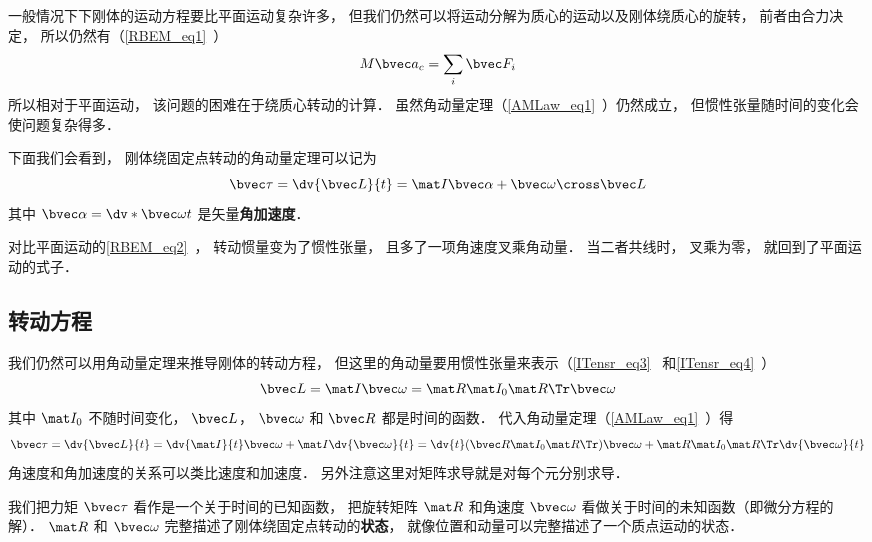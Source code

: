 

一般情况下下刚体的运动方程要比平面运动复杂许多， 但我们仍然可以将运动分解为质心的运动以及刚体绕质心的旋转， 前者由合力决定， 所以仍然有（\autoref{RBEM_eq1}~）
\begin{equation}\label{RBEqM_eq8}
M\bvec a_c = \sum_i \bvec F_i
\end{equation}
所以相对于平面运动， 该问题的困难在于绕质心转动的计算． 虽然角动量定理（\autoref{AMLaw_eq1}~）仍然成立， 但惯性张量随时间的变化会使问题复杂得多．

下面我们会看到， 刚体绕固定点转动的角动量定理可以记为
\begin{equation}
\bvec\tau = \dv{\bvec L}{t} = \mat I \bvec\alpha + \bvec\omega \cross \bvec L
\end{equation}
其中 $\bvec\alpha = \dv*{\bvec\omega}{t}$ 是矢量\textbf{角加速度}．

对比平面运动的\autoref{RBEM_eq2}~， 转动惯量变为了惯性张量， 且多了一项角速度叉乘角动量． 当二者共线时， 叉乘为零， 就回到了平面运动的式子．

\subsection{转动方程}
我们仍然可以用角动量定理来推导刚体的转动方程， 但这里的角动量要用惯性张量来表示（\autoref{ITensr_eq3}~ 和\autoref{ITensr_eq4}~）
\begin{equation}
\bvec L = \mat I \bvec \omega = \mat R \mat I_0 \mat R\Tr \bvec \omega
\end{equation}
其中 $\mat I_0$ 不随时间变化， $\bvec L$， $\bvec \omega$ 和 $\bvec R$ 都是时间的函数． 代入角动量定理（\autoref{AMLaw_eq1}~）得
\begin{equation}\label{RBEqM_eq3}
\bvec \tau = \dv{\bvec L}{t} = \dv{\mat I}{t} \bvec\omega + \mat I \dv{\bvec\omega}{t}
= \dv{t} (\bvec R\mat I_0 \mat R\Tr) \bvec \omega + \mat R \mat I_0 \mat R\Tr \dv{\bvec \omega}{t}
\end{equation}
角速度和角加速度的关系可以类比速度和加速度． 另外注意这里对矩阵求导就是对每个元分别求导．

我们把力矩 $\bvec \tau$ 看作是一个关于时间的已知函数， 把旋转矩阵 $\mat R$ 和角速度 $\bvec \omega$ 看做关于时间的未知函数（即微分方程的解）． $\mat R$ 和 $\bvec \omega$ 完整描述了刚体绕固定点转动的\textbf{状态}， 就像位置和动量可以完整描述了一个质点运动的状态．

